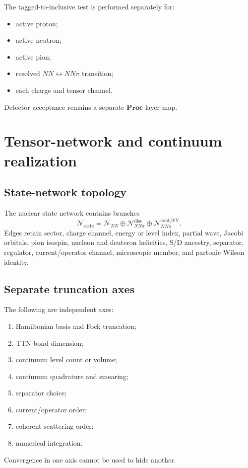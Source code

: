 \documentclass[11pt]{article}
\newcommand{\Proc}{\ensuremath{\mathbf{Proc}}}
\begin{document}
The tagged-to-inclusive test is performed separately for:
\begin{itemize}
\item active proton;
\item active neutron;
\item active pion;
\item resolved \(NN\leftrightarrow NN\pi\) transition;
\item each charge and tensor channel.
\end{itemize}
Detector acceptance remains a separate \(\Proc\)-layer map.

\section{Tensor-network and continuum realization}
\label{sec:tn}

\subsection{State-network topology}

The nuclear state network contains branches
\begin{equation}
 \mathcal N_{\mathrm{state}}
 =
 \mathcal N_{NN}
 \oplus
 \mathcal N_{NN\pi}^{\mathrm{disc}}
 \oplus
 \mathcal N_{NN\pi}^{\mathrm{cont/FV}}.
 \label{eq:n2-network}
\end{equation}
Edges retain sector, charge channel, energy or level index, partial wave,
Jacobi orbitals, pion isospin, nucleon and deuteron helicities, S/D ancestry,
separator, regulator, current/operator channel, microscopic member, and
partonic Wilson identity.

\subsection{Separate truncation axes}

The following are independent axes:
\begin{enumerate}
\item Hamiltonian basis and Fock truncation;
\item TTN bond dimension;
\item continuum level count or volume;
\item continuum quadrature and smearing;
\item separator choice;
\item current/operator order;
\item coherent scattering order;
\item numerical integration.
\end{enumerate}
Convergence in one axis cannot be used to hide another.
\end{document}
